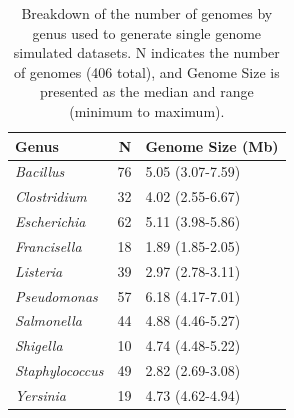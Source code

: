 \documentclass[fleqn,10pt,lineno]{wlpeerj}\usepackage[]{graphicx}\usepackage[]{color}
\begin{document}
\begin{table}[ht]
\centering
\begin{tabular}{lrl}
  \hline
Genus & N & Genome Size (Mb) \\ 
  \hline
\textit{Bacillus} &  76 & 5.05 (3.07-7.59) \\ 
  \textit{Clostridium} &  32 & 4.02 (2.55-6.67) \\ 
  \textit{Escherichia} &  62 & 5.11 (3.98-5.86) \\ 
  \textit{Francisella} &  18 & 1.89 (1.85-2.05) \\ 
  \textit{Listeria} &  39 & 2.97 (2.78-3.11) \\ 
  \textit{Pseudomonas} &  57 & 6.18 (4.17-7.01) \\ 
  \textit{Salmonella} &  44 & 4.88 (4.46-5.27) \\ 
  \textit{Shigella} &  10 & 4.74 (4.48-5.22) \\ 
  \textit{Staphylococcus} &  49 & 2.82 (2.69-3.08) \\ 
  \textit{Yersinia} &  19 & 4.73 (4.62-4.94) \\ 
   \hline
\end{tabular}
\caption{Breakdown of the number of genomes by genus used to generate single genome simulated datasets. N indicates the number of genomes (406 total), and Genome Size is presented as the median and range (minimum to maximum).} 
\label{tab:single_org}
\end{table}
\end{document}
